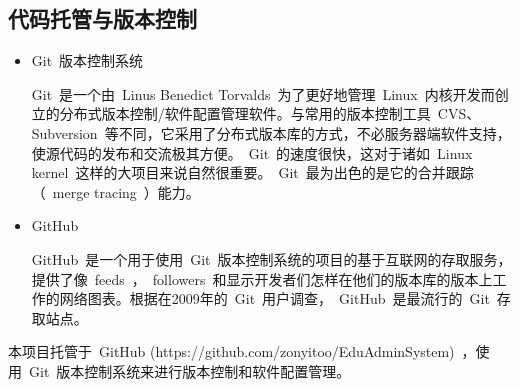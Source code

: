 
\subsection{代码托管与版本控制}
\begin{itemize}
  \item Git~版本控制系统
  
  \CJKindent Git~是一个由~Linus Benedict Torvalds~为了更好地管理~Linux~内核开发而创立的分布式版本控制/软件配置管理软件。与常用的版本控制工具~CVS、Subversion~等不同，它采用了分布式版本库的方式，不必服务器端软件支持，使源代码的发布和交流极其方便。~Git~的速度很快，这对于诸如~Linux kernel~这样的大项目来说自然很重要。~Git~最为出色的是它的合并跟踪（~merge tracing~）能力。
  
  \item GitHub
  
  \CJKindent GitHub~是一个用于使用~Git~版本控制系统的项目的基于互联网的存取服务，提供了像~feeds~，~followers~和显示开发者们怎样在他们的版本库的版本上工作的网络图表。根据在2009年的~Git~用户调查，~GitHub~是最流行的~Git~存取站点。
\end{itemize}

本项目托管于~GitHub (https://github.com/zonyitoo/EduAdminSystem)~，使用~Git~版本控制系统来进行版本控制和软件配置管理。
